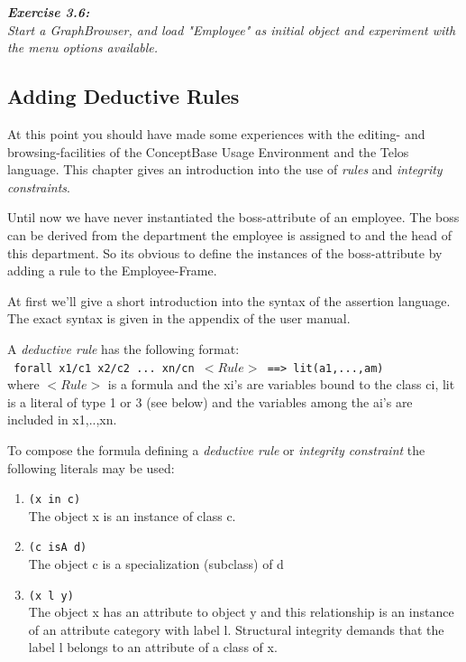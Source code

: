 \documentclass[10pt,a4paper]{article}
\begin{document}
\vspace{0.7cm}
{\it
{\bf Exercise 3.6:} \\
Start a GraphBrowser, and load "Employee" as initial object and
experiment with the menu options available.
} \\

\subsection{Adding Deductive Rules}

At this point you should have made some experiences with the editing- and
browsing-facilities of the ConceptBase Usage Environment and the
Telos language. This chapter gives an introduction into the use of {\em rules}
and {\em integrity constraints}.

Until now we have never instantiated the boss-attribute of an employee.
The boss can be derived from the department the employee is assigned
to and the head of this department. So its obvious to define the instances
of the boss-attribute by adding a rule to the Employee-Frame.

At first we'll give a short introduction into the syntax of the assertion language. The exact syntax is given in the appendix of the user manual.

A {\em deductive rule} has the following format: \\

{\tt
forall x1/c1 x2/c2 ... xn/cn $<Rule>$ ==> lit(a1,...,am)
}\\

where $<Rule>$ is a formula and the xi's are variables bound to the
class ci, lit is a literal of type 1 or 3 (see below) and the variables among
the ai's are included in x1,..,xn.

To compose the formula defining a {\em deductive rule} or {\em integrity constraint} the following literals may be used:

\begin{enumerate}
\item {\tt (x in c)}\\
  The object x is an instance of class c.
\item {\tt (c isA d)}\\
  The object c is a specialization (subclass) of d
\item {\tt (x l y)}\\
  The object x has an attribute to object y and this relationship is an
  instance of an attribute category with label l. Structural integrity
  demands that the label l belongs to an attribute of a class of x.
\end{enumerate}
\end{document}
